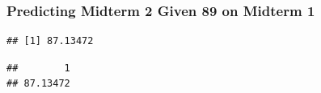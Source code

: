 \begin{frame}[fragile]
  \frametitle{Predicting Midterm 2 Given 89 on Midterm 1}
  \small

\begin{knitrout}
\color{fgcolor}\begin{kframe}
\begin{alltt}
 \hlopt{+}  \hlopt{*} 
\end{alltt}
\begin{verbatim}
## [1] 87.13472
\end{verbatim}
\begin{alltt}
 \hlkwb{<-} \hlstd{(} \hlstd{=} \hlstd{)}
  
\end{alltt}
\begin{verbatim}
##        1 
## 87.13472
\end{verbatim}
\end{kframe}
\end{knitrout}

\end{frame}

